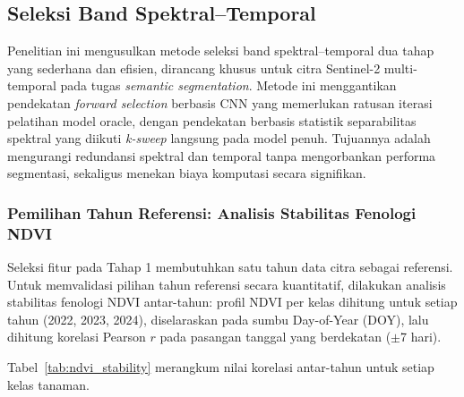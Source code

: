 \subsection{Seleksi Band Spektral--Temporal}

Penelitian ini mengusulkan metode seleksi band spektral--temporal dua tahap yang sederhana dan efisien, dirancang khusus untuk citra Sentinel-2 multi-temporal pada tugas \textit{semantic segmentation}.
Metode ini menggantikan pendekatan \textit{forward selection} berbasis CNN yang memerlukan ratusan iterasi pelatihan model oracle, dengan pendekatan berbasis statistik separabilitas spektral yang diikuti \textit{k-sweep} langsung pada model penuh.
Tujuannya adalah mengurangi redundansi spektral dan temporal tanpa mengorbankan performa segmentasi, sekaligus menekan biaya komputasi secara signifikan.

\subsubsection{Pemilihan Tahun Referensi: Analisis Stabilitas Fenologi NDVI}
\label{subsubsec:tahun_referensi}

Seleksi fitur pada Tahap 1 membutuhkan satu tahun data citra sebagai referensi.
Untuk memvalidasi pilihan tahun referensi secara kuantitatif, dilakukan analisis stabilitas fenologi NDVI antar-tahun: profil NDVI per kelas dihitung untuk setiap tahun (2022, 2023, 2024), diselaraskan pada sumbu Day-of-Year (DOY), lalu dihitung korelasi Pearson $r$ pada pasangan tanggal yang berdekatan ($\pm$7 hari).

Tabel~\ref{tab:ndvi_stability} merangkum nilai korelasi antar-tahun untuk setiap kelas tanaman.

